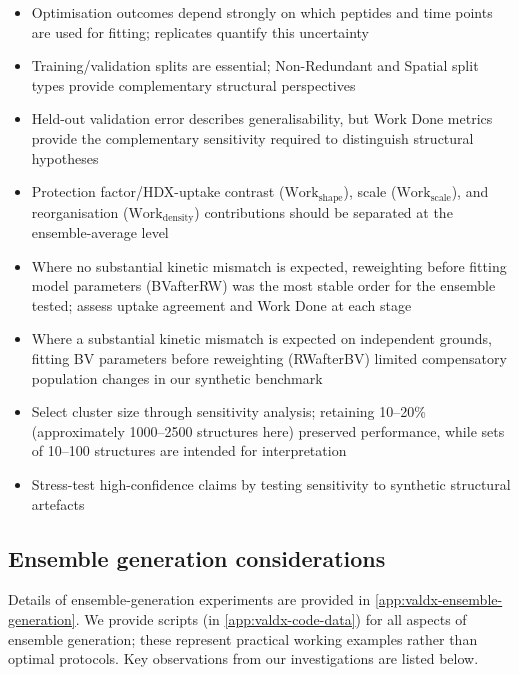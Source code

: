 \begin{itemize}
    \item Optimisation outcomes depend strongly on which peptides and time points are used for fitting; replicates quantify this uncertainty
    \item Training/validation splits are essential; Non-Redundant and Spatial split types provide complementary structural perspectives
    \item Held-out validation error describes generalisability, but Work Done metrics provide the complementary sensitivity required to distinguish structural hypotheses
    \item Protection factor/HDX-uptake contrast ($\text{Work}_\text{shape}$), scale ($\text{Work}_\text{scale}$), and reorganisation ($\text{Work}_\text{density}$) contributions should be separated at the ensemble-average level
    \item Where no substantial kinetic mismatch is expected, reweighting before fitting model parameters (BVafterRW) was the most stable order for the ensemble tested; assess uptake agreement and Work Done at each stage
    \item Where a substantial kinetic mismatch is expected on independent grounds, fitting BV parameters before reweighting (RWafterBV) limited compensatory population changes in our synthetic benchmark
    \item Select cluster size through sensitivity analysis; retaining 10--20\% (approximately 1000--2500 structures here) preserved performance, while sets of 10--100 structures are intended for interpretation
    \item Stress-test high-confidence claims by testing sensitivity to synthetic structural artefacts
\end{itemize}

\subsection{Ensemble generation considerations}
\label{sec:valdx-generation-notes}

Details of ensemble-generation experiments are provided in \cref{app:valdx-ensemble-generation}. We provide scripts (in \cref{app:valdx-code-data}) for all aspects of ensemble generation; these represent practical working examples rather than optimal protocols. Key observations from our investigations are listed below.

